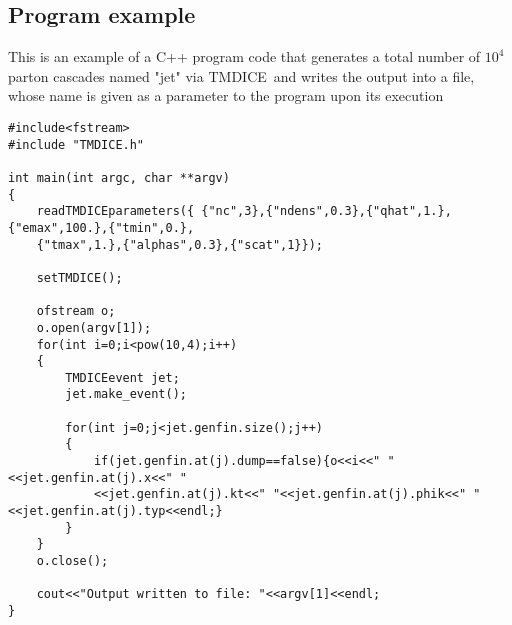 \documentclass[preprint,12pt]{elsarticle}
\newcommand{\tmdice}{{\sf TMDICE}}
\begin{document}
\subsection{Program example}
This is an example of a C++ program code that generates a total number of $10^4$ parton cascades named "jet"  via \tmdice\, and writes the output into a file, whose name is given as a parameter to the program upon its execution
%
\begin{verbatim}
#include<fstream>
#include "TMDICE.h"

int main(int argc, char **argv)
{
	readTMDICEparameters({ {"nc",3},{"ndens",0.3},{"qhat",1.},{"emax",100.},{"tmin",0.},
	{"tmax",1.},{"alphas",0.3},{"scat",1}});
	
	setTMDICE();
	
	ofstream o;
	o.open(argv[1]);
	for(int i=0;i<pow(10,4);i++)
	{
		TMDICEevent jet;
		jet.make_event();
		
		for(int j=0;j<jet.genfin.size();j++)
		{
			if(jet.genfin.at(j).dump==false){o<<i<<" "<<jet.genfin.at(j).x<<" "
			<<jet.genfin.at(j).kt<<" "<<jet.genfin.at(j).phik<<" "<<jet.genfin.at(j).typ<<endl;}
		}
	}
	o.close();
	
	cout<<"Output written to file: "<<argv[1]<<endl;
}
\end{verbatim}

\end{document}
